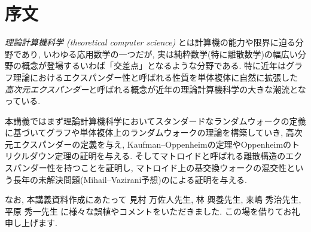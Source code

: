 \chapter*{序文}
\emph{理論計算機科学 (theoretical computer science)} とは計算機の能力や限界に迫る分野であり, いわゆる応用数学の一つだが, 
    実は純粋数学(特に離散数学)の幅広い分野の概念が登場するいわば「交差点」となるような分野である.
特に近年はグラフ理論におけるエクスパンダー性と呼ばれる性質を単体複体に自然に拡張した
    \emph{高次元エクスパンダー}と呼ばれる概念が近年の理論計算機科学の大きな潮流となっている.

本講義ではまず理論計算機科学においてスタンダードなランダムウォークの定義に基づいてグラフや単体複体上のランダムウォークの理論を構築していき, 高次元エクスパンダーの定義を与え,
Kaufman--Oppenheimの定理やOppenheimのトリクルダウン定理の証明を与える.
そしてマトロイドと呼ばれる離散構造のエクスパンダー性を持つことを証明し, マトロイド上の基交換ウォークの混交性という長年の未解決問題(Mihail--Vazirani予想)の\citet{ALOV24}による証明を与える.

なお, 本講義資料作成にあたって
見村 万佐人先生,
林 興養先生,
来嶋 秀治先生,
平原 秀一先生
に様々な誤植やコメントをいただきました.
この場を借りてお礼申し上げます.

